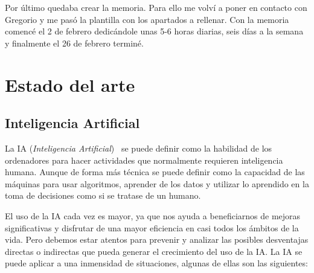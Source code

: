 \documentclass[a4paper, 12pt]{book}
\begin{document}
Por último quedaba crear la memoria. Para ello me volví a poner en contacto con Gregorio y me pasó la plantilla con los apartados a rellenar. Con la memoria comencé el 2 de febrero dedicándole unas 5-6 horas diarias, seis días a la semana y finalmente el 26 de febrero terminé.


\cleardoublepage
\chapter{Estado del arte}
\label{chap:estado}

\section{Inteligencia Artificial} 
\label{sec:InteligenciaArtificial}

La IA (\emph{Inteligencia Artificial})~\cite{rouhiainen2018inteligencia} se puede definir como la habilidad de los ordenadores para hacer actividades que normalmente requieren inteligencia humana. 
Aunque de forma más técnica se puede definir como la capacidad de las máquinas para usar algoritmos, aprender de los datos y utilizar lo aprendido en la toma de decisiones como si se tratase de un humano.

El uso de la IA cada vez es mayor, ya que nos ayuda a beneficiarnos de mejoras significativas y disfrutar de una mayor eficiencia en casi todos los ámbitos de la vida. 
Pero debemos estar atentos para prevenir y analizar las posibles desventajas directas o indirectas que pueda generar el crecimiento del uso de la IA. 
La IA se puede aplicar a una inmensidad de situaciones, algunas de ellas son las siguientes:
\end{document}

